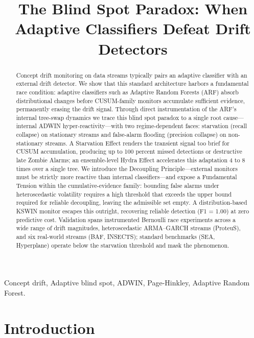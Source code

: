 \documentclass[10pt,conference]{IEEEtran}
\title{The Blind Spot Paradox: When Adaptive Classifiers Defeat Drift Detectors}
\author{\IEEEauthorblockN{Anonymous Author(s)}
\IEEEauthorblockA{\textit{Anonymous Affiliation(s)}\\
Paper under Triple-Blind Review}}
\theoremstyle{definition}
\begin{document}
\maketitle

\begin{abstract}
  Concept drift monitoring on data streams typically pairs an adaptive classifier with an external drift detector. We show that this standard architecture harbors a fundamental race condition: adaptive classifiers such as Adaptive Random Forests (ARF) absorb distributional changes before CUSUM-family monitors accumulate sufficient evidence, permanently erasing the drift signal. Through direct instrumentation of the ARF's internal tree-swap dynamics we trace this blind spot paradox to a single root cause---internal ADWIN hyper-reactivity---with two regime-dependent faces: starvation (recall collapse) on stationary streams and false-alarm flooding (precision collapse) on non-stationary streams. A Starvation Effect renders the transient signal too brief for CUSUM accumulation, producing up to 100 percent missed detections or destructive late Zombie Alarms; an ensemble-level Hydra Effect accelerates this adaptation 4 to 8 times over a single tree. We introduce the Decoupling Principle---external monitors must be strictly more reactive than internal classifiers---and expose a Fundamental Tension within the cumulative-evidence family: bounding false alarms under heteroscedastic volatility requires a high threshold that exceeds the upper bound required for reliable decoupling, leaving the admissible set empty. A distribution-based KSWIN monitor escapes this outright, recovering reliable detection (F1 = 1.00) at zero predictive cost. Validation spans instrumented Bernoulli race experiments across a wide range of drift magnitudes, heteroscedastic ARMA--GARCH streams (ProteuS), and six real-world streams (BAF, INSECTS); standard benchmarks (SEA, Hyperplane) operate below the starvation threshold and mask the phenomenon.
\end{abstract}

\begin{IEEEkeywords}
  Concept drift, Adaptive blind spot, ADWIN, Page-Hinkley, Adaptive Random Forest.
\end{IEEEkeywords}

\section{Introduction}\label{sec:intro}
\end{document}
